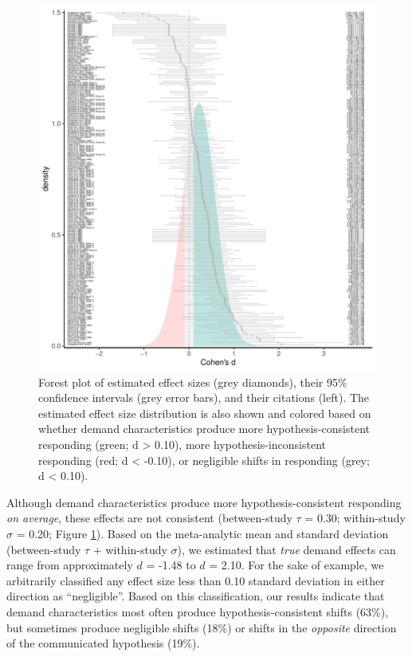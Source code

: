 \documentclass[
  man,floatsintext]{apa6}
\begin{document}
\begin{figure}
\centering
\includegraphics{metaware_manuscript_files/figure-latex/forest-1.pdf}
\caption{\label{fig:forest}Forest plot of estimated effect sizes (grey diamonds), their 95\% confidence intervals (grey error bars), and their citations (left). The estimated effect size distribution is also shown and colored based on whether demand characteristics produce more hypothesis-consistent responding (green; d \textgreater{} 0.10), more hypothesis-inconsistent responding (red; d \textless{} -0.10), or negligible shifts in responding (grey; \textbar d\textbar{} \textless{} 0.10).}
\end{figure}

Although demand characteristics produce more hypothesis-consistent responding \emph{on average}, these effects are not consistent (between-study \(\tau\) = 0.30; within-study \(\sigma\) = 0.20; Figure \ref{fig:forest}). Based on the meta-analytic mean and standard deviation (between-study \(\tau\) + within-study \(\sigma\)), we estimated that \emph{true} demand effects can range from approximately \(d\) = -1.48 to \(d\) = 2.10. For the sake of example, we arbitrarily classified any effect size less than 0.10 standard deviation in either direction as ``negligible''. Based on this classification, our results indicate that demand characteristics most often produce hypothesis-consistent shifts (63\%), but sometimes produce negligible shifts (18\%) or shifts in the \emph{opposite} direction of the communicated hypothesis (19\%).
\end{document}
